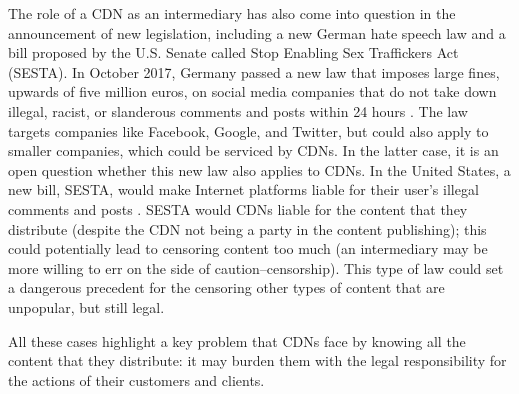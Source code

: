 The role of a CDN as an intermediary has also come into question in the announcement of new legislation, including a new German hate speech law and 
a bill proposed by the U.S. Senate called Stop Enabling Sex Traffickers Act (SESTA).  In October 2017, Germany passed a new law that imposes large fines, upwards of five million euros,
on social media companies that do not take down illegal, racist, or slanderous comments and posts within 24 hours \cite{nytimes_hatespeech}.  The law 
targets companies like Facebook, Google, and Twitter, but could also apply to smaller companies, which could be serviced by CDNs.  In the latter case, it is 
an open question whether this new law also applies to CDNs.  In the United States, a new bill, SESTA, would make Internet platforms liable for their user's illegal comments 
and posts \cite{medium_sesta}.  SESTA would CDNs liable for the content that they distribute (despite the CDN not being a party in the content publishing); this could potentially lead to 
censoring content too much (an intermediary may be more willing to err on the side of caution--censorship).  This type of law could set a dangerous precedent 
for the censoring other types of content that are unpopular, but still legal. 

All these cases highlight a key problem that CDNs face by knowing all the content
that they distribute: it may burden them with the legal responsibility for the actions of their customers 
and clients.
